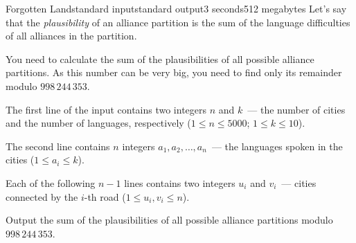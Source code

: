 \begin{problem}{Forgotten Land}{standard input}{standard output}{3 seconds}{512 megabytes}
Let's say that the \textit{plausibility} of an alliance partition is the sum of the language difficulties of all alliances in the partition.

You need to calculate the sum of the plausibilities of all possible alliance partitions. As this number can be very big, you need to find only its remainder modulo $998\,244\,353$.


\InputFile
The first line of the input contains two integers $n$ and $k$~--- the number of cities and the number of languages, respectively ($1 \le n \le 5000$; $1 \le k \le 10$).

The second line contains $n$ integers $a_1, a_2, \ldots, a_n$~--- the languages spoken in the cities ($1 \le a_i \le k$).

Each of the following $n - 1$ lines contains two integers $u_i$ and $v_i$~--- cities connected by the $i$-th road ($1 \le u_i, v_i \le n$).

\OutputFile
Output the sum of the plausibilities of all possible alliance partitions modulo $998\,244\,353$.

\Examples


\thelinewidth
{}\thelinewidth
{}\thelinewidth
\def\kwExampleNotes{Illustration}

\begin{examplethree}
%
%
\end{examplethree}


\end{problem}
